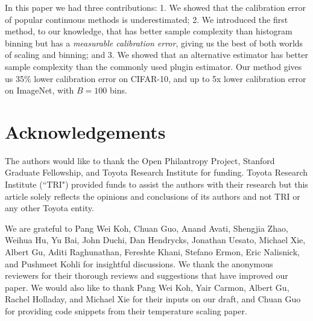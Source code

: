 In this paper we had three contributions: 1. We showed that the calibration error of popular continuous methods is underestimated; 2. We introduced the first method, to our knowledge, that has better sample complexity than histogram binning but has a \emph{measurable calibration error}, giving us the best of both worlds of scaling and binning; and 3. We showed that an alternative estimator has better sample complexity than the commonly used plugin estimator. Our method gives us 35\% lower calibration error on CIFAR-10, and up to 5x lower calibration error on ImageNet, with $B = 100$ bins.

\section{Acknowledgements}

The authors would like to thank the Open Philantropy Project, Stanford Graduate Fellowship, and Toyota Research Institute for funding. Toyota Research Institute (``TRI") provided funds to assist the authors with their research but this article solely reflects the opinions and conclusions of its authors and not TRI or any other Toyota entity.

We are grateful to Pang Wei Koh, Chuan Guo, Anand Avati, Shengjia Zhao, Weihua Hu, Yu Bai, John Duchi, Dan Hendrycks, Jonathan Uesato, Michael Xie, Albert Gu, Aditi Raghunathan, Fereshte Khani, Stefano Ermon, Eric Nalisnick, and Pushmeet Kohli for insightful discussions. We thank the anonymous reviewers for their thorough reviews and suggestions that have improved our paper. We would also like to thank Pang Wei Koh, Yair Carmon, Albert Gu, Rachel Holladay, and Michael Xie for their inputs on our draft, and Chuan Guo for providing code snippets from their temperature scaling paper.

\newpage




